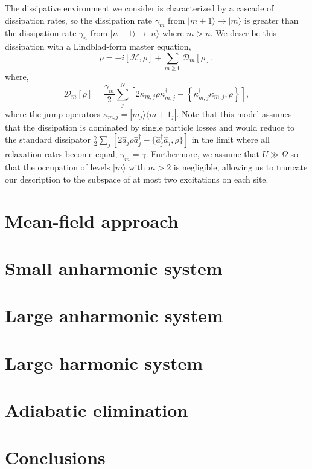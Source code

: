 The dissipative environment we consider is characterized by a cascade of dissipation rates, so the dissipation rate \(\gamma_{m}\) from \(|m+1\rangle \rightarrow |m\rangle\) is greater than the dissipation rate \(\gamma_{n}\) from \(|n+1\rangle \rightarrow |n\rangle\) where \(m > n\). We describe this dissipation with a Lindblad-form master equation,
\begin{equation}
	\dot{\rho} = -i\left[\mathcal{H}, \rho\right] + \sum_{m \geq 0} \mathcal{D}_{m}[\rho],
	\label{eq:dnlca2-5}
\end{equation}
where,
\begin{equation}
	\mathcal{D}_{m} [\rho] = \frac{\gamma_{m}}{2} \sum_{j}^{N} \left[ 2\kappa_{m,j}\rho\kappa_{m,j}^{\dagger} - \left\{\kappa_{m,j}^{\dagger}\kappa_{m,j}, \rho \right\}\right],
	\label{eq:dnlca2-6}
\end{equation}
where the jump operators \(\kappa_{m,j} = |m_{j} \rangle \langle m+1_{j}|\). Note that this model assumes that the dissipation is dominated by single particle losses and would reduce to the standard dissipator \(\frac{\gamma}{2} \sum_{j}\left[2\hat{a}_{j}\rho\hat{a}_{j}^{\dagger} - \{\hat{a}_{j}^{\dagger}\hat{a}_{j}, \rho\}\right]\) in the limit where all relaxation rates become equal, \(\gamma_{m} = \gamma\). Furthermore, we assume that \(U \gg \Omega\) so that the occupation of levels \(|m\rangle\) with \(m > 2\) is negligible, allowing us to truncate our description to the subspace of at most two excitations on each site. 

\section{Mean-field approach}

\section{Small anharmonic system}

\section{Large anharmonic system}

\section{Large harmonic system}

\section{Adiabatic elimination}

\section{Conclusions}
